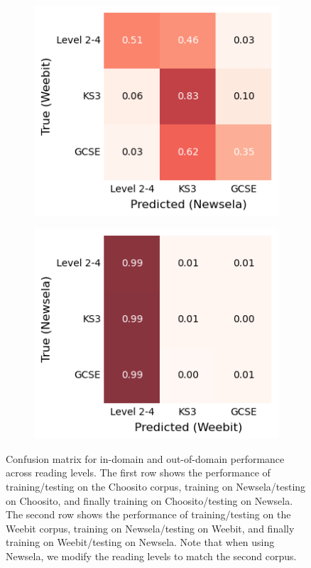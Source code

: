 \documentclass[thesis.tex]{subfiles}
\begin{document}
\begin{figure}
\begin{subfigure}[c]{.31\textwidth}
    \end{subfigure}%
    \hfill
    \begin{subfigure}[c]{.31\textwidth}
    \centering
    \includegraphics[width=\textwidth]{pictures/train_newsela_test_weebit.png}
    \end{subfigure}%
    \hfill
    \begin{subfigure}[c]{.31\textwidth}
    \centering
    \includegraphics[width=\textwidth]{pictures/train_weebit_test_newsela.png}
    \end{subfigure}
    \caption{Confusion matrix for in-domain and out-of-domain performance across reading levels. The first row shows the performance of training/testing on the Choosito corpus, training on Newsela/testing on Choosito, and finally training on Choosito/testing on Newsela. The second row shows the performance of training/testing on the Weebit corpus, training on Newsela/testing on Weebit, and finally training on Weebit/testing on Newsela. Note that when using Newsela, we modify the reading levels to match the second corpus.}
    \label{fig:domain_reading_levels}
\end{figure}
\end{document}
